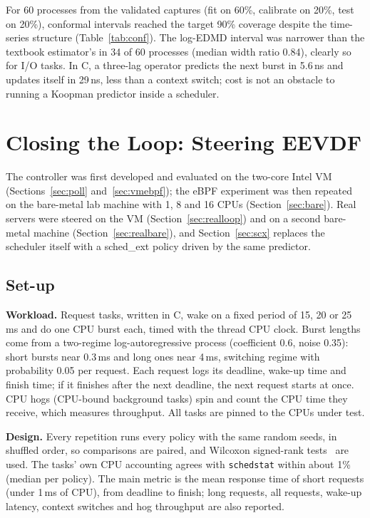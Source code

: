 \documentclass[conference,onecolumn,11pt]{IEEEtran}
\begin{document}
For 60 processes from the validated captures (fit on 60\%, calibrate on 20\%, test on 20\%), conformal intervals reached the target 90\% coverage despite the time-series structure (Table~\ref{tab:conf}). The log-EDMD interval was narrower than the textbook estimator's in 34 of 60 processes (median width ratio 0.84), clearly so for I/O tasks. In C, a three-lag operator predicts the next burst in 5.6\,ns and updates itself in 29\,ns, less than a context switch; cost is not an obstacle to running a Koopman predictor inside a scheduler.

\section{Closing the Loop: Steering EEVDF}\label{sec:closed}
The controller was first developed and evaluated on the two-core Intel VM (Sections~\ref{sec:poll} and~\ref{sec:vmebpf}); the eBPF experiment was then repeated on the bare-metal lab machine with 1, 8 and 16 CPUs (Section~\ref{sec:bare}). Real servers were steered on the VM (Section~\ref{sec:realloop}) and on a second bare-metal machine (Section~\ref{sec:realbare}), and Section~\ref{sec:scx} replaces the scheduler itself with a sched\_ext policy driven by the same predictor.

\subsection{Set-up}
\textbf{Workload.} Request tasks, written in C, wake on a fixed period of 15, 20 or 25\,ms and do one CPU burst each, timed with the thread CPU clock. Burst lengths come from a two-regime log-autoregressive process (coefficient 0.6, noise 0.35): short bursts near 0.3\,ms and long ones near 4\,ms, switching regime with probability 0.05 per request. Each request logs its deadline, wake-up time and finish time; if it finishes after the next deadline, the next request starts at once. CPU hogs (CPU-bound background tasks) spin and count the CPU time they receive, which measures throughput. All tasks are pinned to the CPUs under test.

\textbf{Design.} Every repetition runs every policy with the same random seeds, in shuffled order, so comparisons are paired, and Wilcoxon signed-rank tests~\cite{wilcoxon1945} are used. The tasks' own CPU accounting agrees with \texttt{schedstat} within about 1\% (median per policy). The main metric is the mean response time of short requests (under 1\,ms of CPU), from deadline to finish; long requests, all requests, wake-up latency, context switches and hog throughput are also reported.
\end{document}
